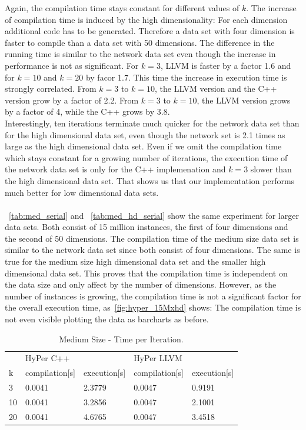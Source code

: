 Again, the compilation time stays constant for different values of $k$. The increase of compilation time is induced by the high dimensionality: For each dimension additional code has to be generated. Therefore a data set with four dimension is faster to compile than a data set with 50 dimensions. 
The difference in the running time is similar to the network data set even though the increase in performance is not as significant. For $k = 3$, LLVM is faster by a factor 1.6 and for $k = 10$ and $k = 20$ by facor 1.7. This time the increase in execution time is strongly correlated. From $k = 3$ to $k = 10$, the LLVM version and the C++ version grow by a factor of 2.2. From $k = 3$ to $k = 10$, the LLVM version grows by a factor of 4, while the C++ grows by 3.8.
\\
Interestingly, ten iterations terminate much quicker for the network data set than for the high dimensional data set, even though the network set is 2.1 times as large as the high dimensional data set. Even if we omit the compilation time which stays constant for a growing number of iterations, the execution time of the network data set is only for the C++ implemenation and $k = 3$ slower than the high dimensional data set. That shows us that our implementation performs much better for low dimensional data sets.
\\
\\
~\autoref{tab:med_serial} and ~\autoref{tab:med_hd_serial} show the same experiment for larger data sets. Both consist of 15 million instances, the first of four dimensions and the second of 50 dimensions. The compilation time of the medium size data set is similar to the network data set since both consist of four dimensions. The same is true for the medium size high dimensional data set and the smaller high dimensional data set. This proves that the compilation time is independent on the data size and only affect by the number of dimensions. However, as the number of instances is growing, the compilation time is not a significant factor for the overall execution time, as~\autoref{fig:hyper_15Mxhd} shows: The compilation time is not even visible plotting the data as barcharts as before.

\begin{table}[htsb]
  \caption[Medium Size - Time per Iteration]{Medium Size - Time per Iteration.}
  \label{tab:med_serial}
  \centering
  \begin{tabular}{l l l l l}
    \toprule
      & HyPer C++ & & HyPer LLVM & \\
      k & compilation[s] & execution[s] & compilation[s] & execution[s] \\
    \midrule
      3  & 0.0041 & 2.3779 & 0.0047 & 0.9191 \\
      10 & 0.0041 & 3.2856 & 0.0047 & 2.1001 \\
      20 & 0.0041 & 4.6765 & 0.0047 & 3.4518 \\
    \bottomrule
  \end{tabular}
\end{table}


